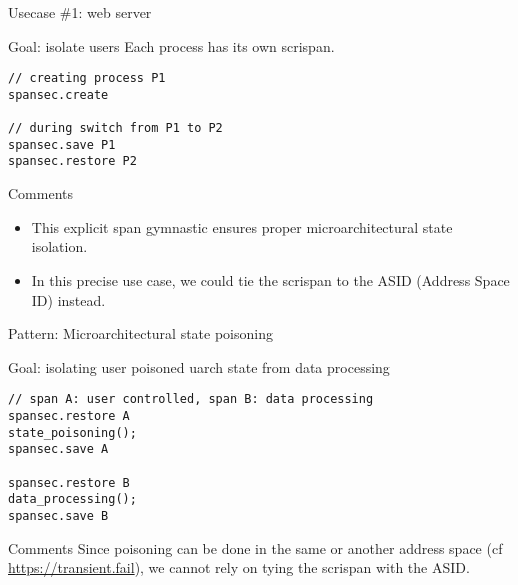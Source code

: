 \documentclass[11pt]{beamer}
\newcommand{\cmark}{\textcolor{green}{\ding{51}}}%
\newcommand{\xmark}{\textcolor{red}{\ding{55}}}%
\begin{document}
\begin{frame}[fragile]{Usecase \#1: web server}
        \begin{block}{Goal: isolate users}
                Each process has its own scrispan.
                \begin{verbatim}
// creating process P1
spansec.create

// during switch from P1 to P2
spansec.save P1
spansec.restore P2   
                \end{verbatim}
                
        \end{block}

        \begin{alertblock}{Comments}
                \begin{itemize}
                        \item \cmark{} This explicit span gymnastic ensures proper microarchitectural state isolation.
                        \item \xmark{} In this precise use case, we could tie the scrispan to the ASID (Address Space ID) instead.
                \end{itemize}
        \end{alertblock}
        
\end{frame}

\begin{frame}[fragile]{Pattern: Microarchitectural state poisoning}
        \begin{block}{Goal: isolating user poisoned uarch state from data processing}
                \begin{verbatim}
// span A: user controlled, span B: data processing
spansec.restore A
state_poisoning();
spansec.save A

spansec.restore B
data_processing();
spansec.save B
                \end{verbatim}
        \end{block}

        \begin{alertblock}{Comments}
                Since poisoning can be done in the same or another address space (cf \url{https://transient.fail}), we cannot rely on tying the scrispan with the ASID.
                
        \end{alertblock}
\end{frame}
\end{document}
